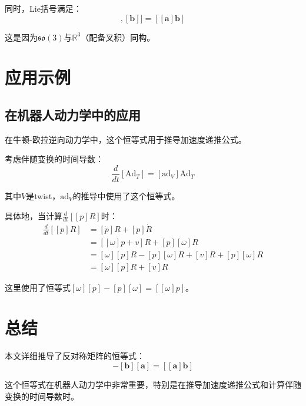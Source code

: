 \documentclass[12pt,a4paper]{article}
\begin{document}
同时，Lie括号满足：
\begin{equation}
[[\bm{a}], [\bm{b}]] = [[\bm{a}]\bm{b}]
\end{equation}

这是因为$\mathfrak{so}(3)$与$\mathbb{R}^3$（配备叉积）同构。

\section{应用示例}

\subsection{在机器人动力学中的应用}

在牛顿-欧拉逆向动力学中，这个恒等式用于推导加速度递推公式。

考虑伴随变换的时间导数：
\begin{equation}
\frac{d}{dt}[\text{Ad}_{T}] = [\text{ad}_V] \text{Ad}_T
\end{equation}

其中$V$是twist，$\text{ad}_V$的推导中使用了这个恒等式。

具体地，当计算$\frac{d}{dt}[[p]R]$时：
\begin{align}
\frac{d}{dt}[[p]R] &= [\dot{p}]R + [p]\dot{R} \\
&= [[\omega]p + v]R + [p][\omega]R \\
&= [\omega][p]R - [p][\omega]R + [v]R + [p][\omega]R \\
&= [\omega][p]R + [v]R
\end{align}

这里使用了恒等式$[\omega][p] - [p][\omega] = [[\omega]p]$。

\section{总结}

本文详细推导了反对称矩阵的恒等式：
\begin{equation}
[\bm{a}][\bm{b}] - [\bm{b}][\bm{a}] = [[\bm{a}]\bm{b}]
\end{equation}

这个恒等式在机器人动力学中非常重要，特别是在推导加速度递推公式和计算伴随变换的时间导数时。
\end{document}
